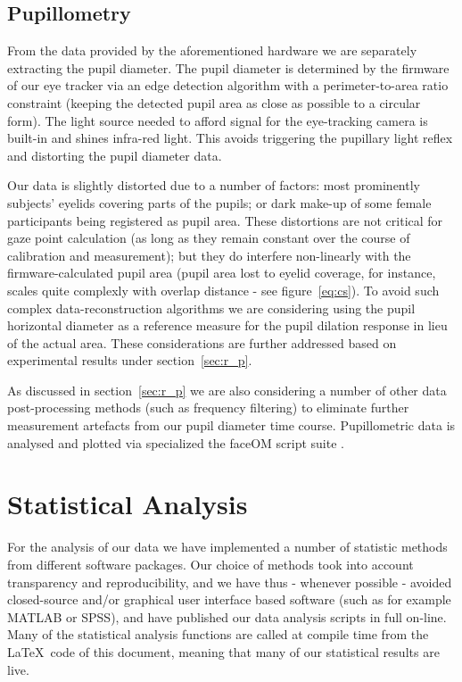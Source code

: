 	\subsection{Pupillometry}\label{sec:m_om_pm}
	    From the data provided by the aforementioned hardware we are separately extracting the pupil diameter.
	    The pupil diameter is determined by the firmware of our eye tracker via an edge detection algorithm with a perimeter-to-area ratio constraint
	    (keeping the detected pupil area as close as possible to a circular form).
	    The light source needed to afford signal for the eye-tracking camera is built-in and shines infra-red light.
	    This avoids triggering the pupillary light reflex \citep{Ellis1981} and distorting the pupil diameter data.
	    
	    Our data is slightly distorted due to a number of factors: most prominently subjects' eyelids covering parts of the pupils; or dark make-up of some female participants being registered as pupil area.
	    These distortions are not critical for gaze point calculation (as long as they remain constant over the course of calibration and measurement); 
	    but they do interfere non-linearly with the firmware-calculated pupil area 
	    (pupil area lost to eyelid coverage, for instance, scales quite complexly with overlap distance - see figure~\ref{eq:cs}).
	    To avoid such complex data-reconstruction algorithms we are considering using the pupil horizontal diameter as a reference measure for the pupil dilation response in lieu of the actual area.
	    These considerations are further addressed based on experimental results under section~\ref{sec:r_p}.
	    
	    As discussed in section~\ref{sec:r_p} we are also considering a number of other data post-processing methods (such as frequency filtering) to eliminate further measurement artefacts from our pupil diameter time course.
	    Pupillometric data is analysed and plotted via specialized the faceOM script suite \citep{faceOM}. 
    \section{Statistical Analysis}\label{sec:m_sa}
	For the analysis of our data we have implemented a number of statistic methods from different software packages.
	Our choice of methods took into account transparency and reproducibility, and we have thus - whenever possible - avoided closed-source and/or graphical user interface based software (such as for example MATLAB\textsuperscript{\small\textregistered} or SPSS\textsuperscript{\small\textregistered}), and have published our data analysis scripts in full on-line.
	Many of the statistical analysis functions are called at compile time from the \LaTeX\ code of this document, meaning that many of our statistical results are live.
	
